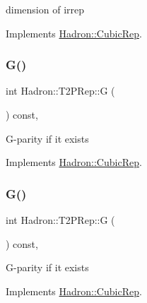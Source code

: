 dimension of irrep 

Implements \mbox{\hyperlink{structHadron_1_1CubicRep_ac178d14064f037a66af4b9fb4b312d51}{Hadron\+::\+Cubic\+Rep}}.

\mbox{\label{structHadron_1_1T2PRep_a6631723323b6b83a42b23f1c93ee60f9}} 
\subsubsection{\texorpdfstring{G()}{G()}\hspace{0.1cm}{\footnotesize\ttfamily [1/2]}}
{\footnotesize\ttfamily int Hadron\+::\+T2\+P\+Rep\+::G (\begin{DoxyParamCaption}{ }\end{DoxyParamCaption}) const\hspace{0.3cm}{\ttfamily [inline]}, {\ttfamily [virtual]}}

G-\/parity if it exists 

Implements \mbox{\hyperlink{structHadron_1_1CubicRep_a52104e43266d1614c00bbd1c3b395458}{Hadron\+::\+Cubic\+Rep}}.

\mbox{\label{structHadron_1_1T2PRep_a6631723323b6b83a42b23f1c93ee60f9}} 
\subsubsection{\texorpdfstring{G()}{G()}\hspace{0.1cm}{\footnotesize\ttfamily [2/2]}}
{\footnotesize\ttfamily int Hadron\+::\+T2\+P\+Rep\+::G (\begin{DoxyParamCaption}{ }\end{DoxyParamCaption}) const\hspace{0.3cm}{\ttfamily [inline]}, {\ttfamily [virtual]}}

G-\/parity if it exists 

Implements \mbox{\hyperlink{structHadron_1_1CubicRep_a52104e43266d1614c00bbd1c3b395458}{Hadron\+::\+Cubic\+Rep}}.

\mbox{\label{structHadron_1_1T2PRep_af477032faaa8fb25f13f9e962dd68437}} 
